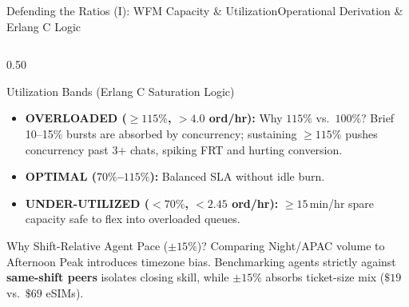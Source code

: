 \documentclass[aspectratio=169,8pt]{beamer}
\begin{document}
\begin{frame}[t]{Defending the Ratios (I): WFM Capacity \& Utilization}{Operational Derivation \& Erlang C Logic}
\begin{columns}[T,onlytextwidth]
  \begin{column}{0.50\textwidth}
    \begin{neutralcard}{Utilization Bands (Erlang C Saturation Logic)}
      {\fontsize{6.7}{8.5}\selectfont
      \begin{itemize}\setlength\itemsep{2.5pt}
        \item \textbf{\color{holaflyred}OVERLOADED ($\geq 115\%$, $>4.0$ ord/hr):} Why $115\%$ vs.\ $100\%$? Brief 10--15\% bursts are absorbed by concurrency; sustaining $\geq 115\%$ pushes concurrency past 3+ chats, spiking FRT and hurting conversion.
        \item \textbf{\color{forestok}OPTIMAL ($70\%$--$115\%$):} Balanced SLA without idle burn.
        \item \textbf{\color{iron}UNDER-UTILIZED ($< 70\%$, $<2.45$ ord/hr):} $\geq 15$\,min/hr spare capacity safe to flex into overloaded queues.
      \end{itemize}
      }
    \end{neutralcard}
    \vspace{4pt}
    \begin{neutralcard}{Why Shift-Relative Agent Pace ($\pm 15\%$)?}
      {\fontsize{6.7}{8.5}\selectfont Comparing Night/APAC volume to Afternoon Peak introduces timezone bias. Benchmarking agents strictly against \textbf{same-shift peers} isolates closing skill, while $\pm 15\%$ absorbs ticket-size mix ($\$19$ vs.\ $\$69$ eSIMs).}
    \end{neutralcard}
  \end{column}
\end{columns}
\end{frame}
\end{document}
